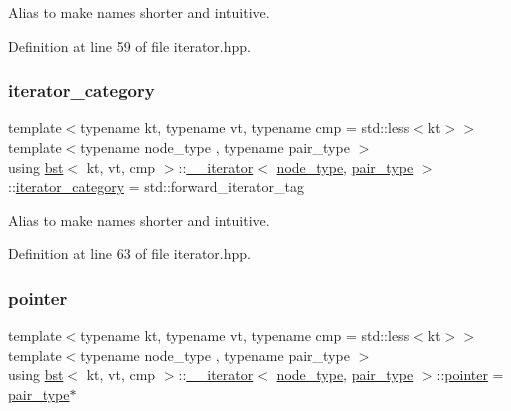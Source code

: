 Alias to make names shorter and intuitive. 

Definition at line 59 of file iterator.\+hpp.

\mbox{\label{classbst_1_1____iterator_a180502873d890f2293f977dd3ace4079}} 
\subsubsection{\texorpdfstring{iterator\+\_\+category}{iterator\_category}}
{\footnotesize\ttfamily template$<$typename kt, typename vt, typename cmp = std\+::less$<$kt$>$$>$ \\
template$<$typename node\+\_\+type , typename pair\+\_\+type $>$ \\
using \hyperlink{classbst}{bst}$<$ kt, vt, cmp $>$\+::\hyperlink{classbst_1_1____iterator}{\+\_\+\+\_\+iterator}$<$ \hyperlink{classbst_a062eb2a1ac54802dbc4f0f74ae2afd01}{node\+\_\+type}, \hyperlink{classbst_a7b11cca2a3b4394915600194f741ab16}{pair\+\_\+type} $>$\+::\hyperlink{classbst_1_1____iterator_a180502873d890f2293f977dd3ace4079}{iterator\+\_\+category} =  std\+::forward\+\_\+iterator\+\_\+tag}

Alias to make names shorter and intuitive. 

Definition at line 63 of file iterator.\+hpp.

\mbox{\label{classbst_1_1____iterator_adb4d1d8f8048f7036ff5ac383ea9c649}} 
\subsubsection{\texorpdfstring{pointer}{pointer}}
{\footnotesize\ttfamily template$<$typename kt, typename vt, typename cmp = std\+::less$<$kt$>$$>$ \\
template$<$typename node\+\_\+type , typename pair\+\_\+type $>$ \\
using \hyperlink{classbst}{bst}$<$ kt, vt, cmp $>$\+::\hyperlink{classbst_1_1____iterator}{\+\_\+\+\_\+iterator}$<$ \hyperlink{classbst_a062eb2a1ac54802dbc4f0f74ae2afd01}{node\+\_\+type}, \hyperlink{classbst_a7b11cca2a3b4394915600194f741ab16}{pair\+\_\+type} $>$\+::\hyperlink{classbst_1_1____iterator_adb4d1d8f8048f7036ff5ac383ea9c649}{pointer} =  \hyperlink{classbst_a7b11cca2a3b4394915600194f741ab16}{pair\+\_\+type}$\ast$}

